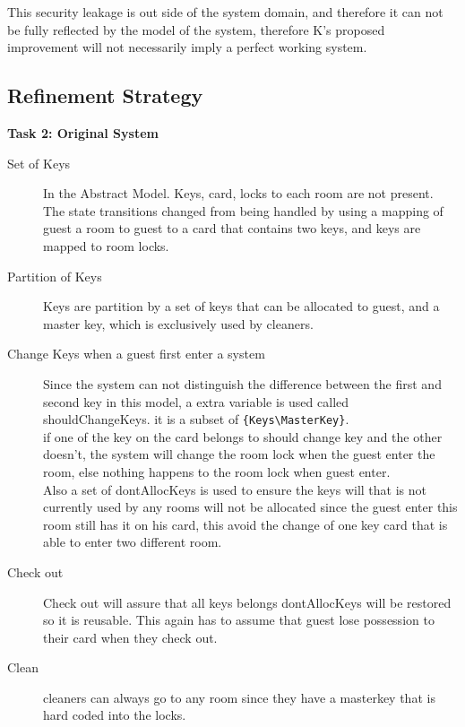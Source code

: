 \documentclass[a4paper]{article}
\begin{document}
This security leakage is out side of the system domain, and therefore it can not be fully reflected by the model of the system, therefore K's proposed improvement will not necessarily imply a perfect working system.\\



\subsection{Refinement Strategy}

\noindent\textbf{Task 2: Original System}

\begin{description}
\item [Set of Keys] In the Abstract Model. Keys, card, locks to each room are not present. The state transitions changed from being handled by using a mapping of guest a room to guest to a card that contains two keys, and keys are mapped to room locks.
\item [Partition of Keys] Keys are partition by a set of keys that can be allocated to guest, and a master key, which is exclusively used by cleaners.
\item [Change Keys when a guest first enter a system] Since the system can not distinguish the difference between the first and second key in this model, a extra variable is used called shouldChangeKeys. it is a subset of \verb+{Keys\MasterKey}+.\\if one of the key on the card belongs to should change key and the other doesn't, the system will change the room lock when the guest enter the room, else nothing happens to the room lock when guest enter.\\Also a set of dontAllocKeys is used to ensure the keys will that is not currently used by any rooms will not be allocated since the guest enter this room still has it on his card, this avoid the change of one key card that is able to enter two different room.
\item [Check out] Check out will assure that all keys belongs dontAllocKeys will be restored so it is reusable. This again has to assume that guest lose possession to their card when they check out.
\item [Clean] cleaners can always go to any room since they have a masterkey that is hard coded into the locks.
\end{description}
\end{document}

